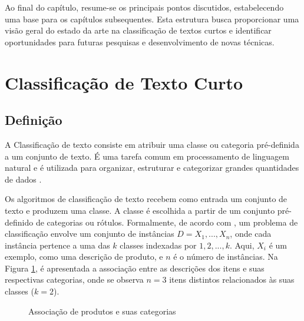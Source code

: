 Ao final do capítulo, resume-se os principais pontos discutidos, estabelecendo uma base para os capítulos subsequentes. Esta estrutura busca proporcionar uma visão geral do estado da arte na classificação de textos curtos e identificar oportunidades para futuras pesquisas e desenvolvimento de novas técnicas.

\section{Classificação de Texto Curto}

\subsection{Definição}

A Classificação de texto consiste em atribuir uma classe ou categoria pré-definida a um conjunto de texto. É uma tarefa comum em processamento de linguagem natural e é utilizada para organizar, estruturar e categorizar grandes quantidades de dados \cite{kowsari2019text} .

Os algoritmos de classificação de texto recebem como entrada um conjunto de texto e produzem uma classe. A classe é escolhida a partir de um conjunto pré-definido de categorias ou rótulos. 
Formalmente, de acordo com \cite{aggarwal2012survey}, um problema de classificação envolve um conjunto de instâncias $D = {X_1,...,X_n}$, onde cada instância pertence a uma das $k$ classes indexadas por ${1,2,...,k}$. Aqui, $X_i$ é um exemplo, como uma descrição de produto, e $n$ é o número de instâncias. Na Figura \ref{fig:produtos_categorias}, é apresentada a associação entre as descrições dos itens e suas respectivas categorias, onde se observa $n=3$ itens distintos relacionados às suas classes ($k=2$).

\begin{figure}[htbp]
    \centering
{}

\caption{Associação de produtos e suas categorias}
    \label{fig:produtos_categorias}
\end{figure}

